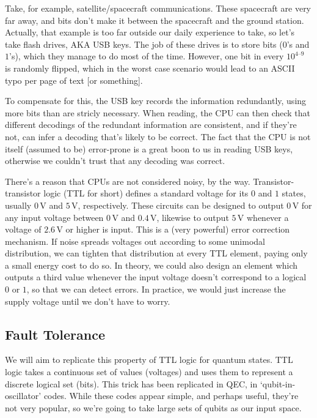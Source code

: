 \documentclass[10pt,a4paper, english]{scrartcl}
\begin{document}
Take, for example, satellite/spacecraft communications. 
These spacecraft are very far away, and bits don't make it between the spacecraft and the ground station. 
Actually, that example is too far outside our daily experience to take, so let's take flash drives, AKA USB keys.
The job of these drives is to store bits ($0$'s and $1$'s), which they manage to do most of the time.
However, one bit in every $10^{4\text{--}9}$ is randomly flipped, which in the worst case scenario would lead to an ASCII typo per page of text [or something].

To compensate for this, the USB key records the information redundantly, using more bits than are stricly necessary.
When reading, the CPU can then check that different decodings of the redundant information are consistent, and if they're not, can infer a decoding that's likely to be correct. 
The fact that the CPU is not itself (assumed to be) error-prone is a great boon to us in reading USB keys, otherwise we couldn't trust that any decoding was correct. 

There's a reason that CPUs are not considered noisy, by the way.
Transistor-transistor logic (TTL for short) defines a standard voltage for its $0$ and $1$ states, usually $0\,\textrm{V}$ and  $5\,\textrm{V}$, respectively.
These circuits can be designed to output $0\,\textrm{V}$ for any input voltage between $0\,\textrm{V}$ and $0.4\,\textrm{V}$, likewise to output $5\,\textrm{V}$ whenever a voltage of $2.6\,\textrm{V}$ or higher is input. 
This is a (very powerful) error correction mechanism. 
If noise spreads voltages out according to some unimodal distribution, we can tighten that distribution at every TTL element, paying only a small energy cost to do so. 
In theory, we could also design an element which outputs a third value whenever the input voltage doesn't correspond to a logical $0$ or $1$, so that we can detect errors. 
In practice, we would just increase the supply voltage until we don't have to worry. 
\subsection{Fault Tolerance}
We will aim to replicate this property of TTL logic for quantum states. 
TTL logic takes a continuous set of values (voltages) and uses them to represent a discrete logical set (bits). 
This trick has been replicated in QEC, in `qubit-in-oscillator' codes. 
While these codes appear simple, and perhaps useful, they're not very popular, so we're going to take large sets of qubits as our input space.
\end{document}
